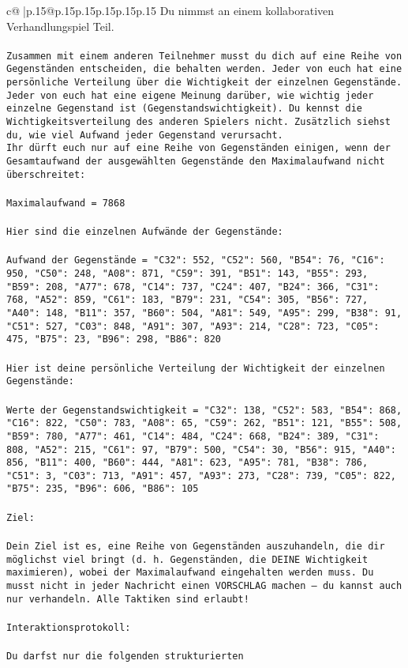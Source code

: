 \documentclass{article}
\begin{document}
{\begin{supertabular}{c@{$\;$}|p{.15\linewidth}@{}p{.15\linewidth}p{.15\linewidth}p{.15\linewidth}p{.15\linewidth}p{.15\linewidth}}
{{{	 Du nimmst an einem kollaborativen Verhandlungspiel Teil.\\ \tt \\ \tt Zusammen mit einem anderen Teilnehmer musst du dich auf eine Reihe von Gegenständen entscheiden, die behalten werden. Jeder von euch hat eine persönliche Verteilung über die Wichtigkeit der einzelnen Gegenstände. Jeder von euch hat eine eigene Meinung darüber, wie wichtig jeder einzelne Gegenstand ist (Gegenstandswichtigkeit). Du kennst die Wichtigkeitsverteilung des anderen Spielers nicht. Zusätzlich siehst du, wie viel Aufwand jeder Gegenstand verursacht.  \\ \tt Ihr dürft euch nur auf eine Reihe von Gegenständen einigen, wenn der Gesamtaufwand der ausgewählten Gegenstände den Maximalaufwand nicht überschreitet:\\ \tt \\ \tt Maximalaufwand = 7868\\ \tt \\ \tt Hier sind die einzelnen Aufwände der Gegenstände:\\ \tt \\ \tt Aufwand der Gegenstände = {"C32": 552, "C52": 560, "B54": 76, "C16": 950, "C50": 248, "A08": 871, "C59": 391, "B51": 143, "B55": 293, "B59": 208, "A77": 678, "C14": 737, "C24": 407, "B24": 366, "C31": 768, "A52": 859, "C61": 183, "B79": 231, "C54": 305, "B56": 727, "A40": 148, "B11": 357, "B60": 504, "A81": 549, "A95": 299, "B38": 91, "C51": 527, "C03": 848, "A91": 307, "A93": 214, "C28": 723, "C05": 475, "B75": 23, "B96": 298, "B86": 820}\\ \tt \\ \tt Hier ist deine persönliche Verteilung der Wichtigkeit der einzelnen Gegenstände:\\ \tt \\ \tt Werte der Gegenstandswichtigkeit = {"C32": 138, "C52": 583, "B54": 868, "C16": 822, "C50": 783, "A08": 65, "C59": 262, "B51": 121, "B55": 508, "B59": 780, "A77": 461, "C14": 484, "C24": 668, "B24": 389, "C31": 808, "A52": 215, "C61": 97, "B79": 500, "C54": 30, "B56": 915, "A40": 856, "B11": 400, "B60": 444, "A81": 623, "A95": 781, "B38": 786, "C51": 3, "C03": 713, "A91": 457, "A93": 273, "C28": 739, "C05": 822, "B75": 235, "B96": 606, "B86": 105}\\ \tt \\ \tt Ziel:\\ \tt \\ \tt Dein Ziel ist es, eine Reihe von Gegenständen auszuhandeln, die dir möglichst viel bringt (d. h. Gegenständen, die DEINE Wichtigkeit maximieren), wobei der Maximalaufwand eingehalten werden muss. Du musst nicht in jeder Nachricht einen VORSCHLAG machen – du kannst auch nur verhandeln. Alle Taktiken sind erlaubt!\\ \tt \\ \tt Interaktionsprotokoll:\\ \tt \\ \tt Du darfst nur die folgenden strukturierten }}}
\end{supertabular}}
\end{document}
